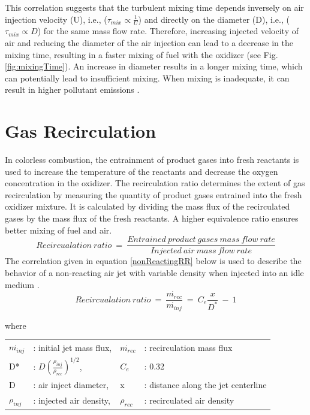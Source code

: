 This correlation suggests that the turbulent mixing time depends inversely on air injection velocity (U), i.e., ($\tau_{mix} \propto \frac{1}{U}$) and directly on the diameter (D), i.e., ($\tau_{mix} \propto D$) for the same mass flow rate. Therefore, increasing injected velocity of air and reducing the diameter of the air injection can lead to a decrease in the mixing time, resulting in a faster mixing of fuel with the oxidizer (see Fig. \ref{fig:mixingTime}). An increase in diameter results in a longer mixing time, which can potentially lead to insufficient mixing. When mixing is inadequate, it can result in higher pollutant emissions \cite{VAThesis2011}.

\section{Gas Recirculation}
In colorless combustion, the entrainment of product gases into fresh reactants is used to increase the temperature of the reactants and decrease the oxygen concentration in the oxidizer. The recirculation ratio determines the extent of gas recirculation by measuring the quantity of product gases entrained into the fresh oxidizer mixture. It is calculated by dividing the mass flux of the recirculated gases by the mass flux of the fresh reactants. A higher equivalence ratio ensures better mixing of fuel and air.
\begin{equation}
    Recircualation\ ratio\ = \ \frac{Entrained\ product\ gases \ mass\ flow\ rate}{Injected\ air\ mass\ flow\ rate }
\end{equation}
The correlation given in equation \ref{nonReactingRR}  below is used to describe the behavior of a non-reacting air jet with variable density when injected into an idle medium \cite{hussein_capp_george_1994,ricou_spalding_1961}.
\begin{equation}\label{nonReactingRR}
    Recircualation\ ratio\ = \ \frac{\dot{m_{rec}}}{\dot{m_{inj}}} \ = \ C_e \frac{x}{D^*} \ - \ 1
\end{equation}

where
\begin{table}[h!]
    \centering
    \begin{tabular}{l l l l}
      $\dot{m_{inj}}$ & : initial jet mass flux, &  $\dot{m_{rec}}$  &   : recirculation mass flux \\
        D* & : $D(\frac{\rho_{inj}}{\rho_{rec}})^{1/2}$, & $C_e$ & : 0.32 \\
        D & : air inject diameter, & x &  : distance along the jet centerline\\
        $\rho_{inj}$ &  : injected air density, & $\rho_{rec}$ &  : recirculated air density
    \end{tabular}
    \label{nonReactingRR Parameters}
\end{table}

